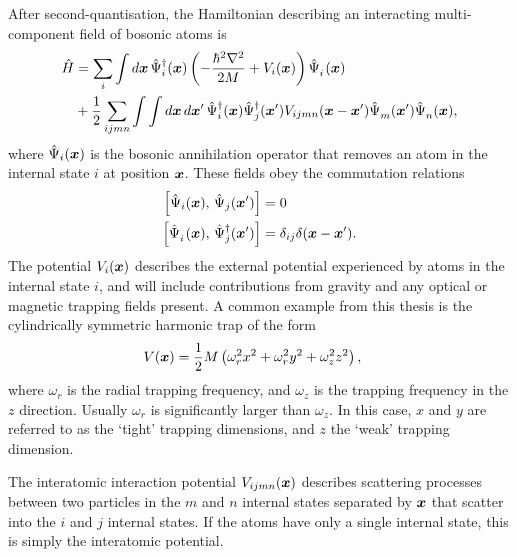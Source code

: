 After second-quantisation, the Hamiltonian describing an interacting multi-component field of bosonic atoms is
\begin{align}
    \label{BackgroundTheory:BasicHamiltonian}
    \begin{split}
        \hat{H} &=
            \sum_i \int d \vect{x}\, \hat{\Psi}_i^\dagger(\vect{x}) \left(- \frac{\hbar^2\nabla^2}{2 M} + V_{i}(\vect{x}) \right) \hat{\Psi}_i^{\phantom{\dagger}}(\vect{x})\\
            &+ \frac{1}{2}\sum_{i j m n} \int \int d\vect{x}\, d\vect{x}'\, \hat{\Psi}_i^\dagger(\vect{x}) \hat{\Psi}_j^\dagger(\vect{x}') V_{ijmn}(\vect{x} - \vect{x}') \hat{\Psi}_m^{\phantom{\dagger}}(\vect{x}') \hat{\Psi}_n^{\phantom{\dagger}}(\vect{x}),
    \end{split}
\end{align}
where $\hat{\Psi}_i(\bm{x})$ is the bosonic annihilation operator that removes an atom in the internal state $i$ at position $\bm{x}$.  These fields obey the commutation relations
\begin{align}
    \left[\hat{\Psi}_i(\bm{x}),\, \hat{\Psi}_j(\bm{x}') \right] &= 0\\
    \left[ \hat{\Psi}_i^{\phantom{\dagger}}(\bm{x}),\, \hat{\Psi}_j^{\dagger}(\bm{x}')\right] &= \delta_{ij} \delta(\bm{x} - \bm{x}').
\end{align}
The potential $V_i(\bm{x})$ describes the external potential experienced by atoms in the internal state $i$, and will include contributions from gravity and any optical or magnetic trapping fields present.  A common example from this thesis is the cylindrically symmetric harmonic trap of the form
\begin{align}
    V(\bm{x}) &= \frac{1}{2} M \left(\omega_r^2 x^2 + \omega_r^2 y^2 + \omega_z^2 z^2 \right),
\end{align}
where $\omega_r$ is the radial trapping frequency, and $\omega_z$ is the trapping frequency in the $z$ direction.  Usually $\omega_r$ is significantly larger than $\omega_z$.  In this case, $x$ and $y$ are referred to as the `tight' trapping dimensions, and $z$ the `weak' trapping dimension.

The interatomic interaction potential $V_{ijmn}(\bm{x})$ describes scattering processes between two particles in the $m$ and $n$ internal states separated by $\bm{x}$ that scatter into the $i$ and $j$ internal states.  If the atoms have only a single internal state, this is simply the interatomic potential.

